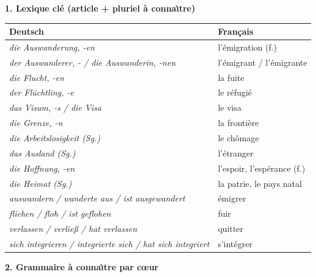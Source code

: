 \documentclass[11pt]{article}
\newcommand{\ière}{\textsuperscript{re}}\newcommand{\ième}{\textsuperscript{e}}
\newcommand{\all}[1]{\ifmmode\text{\textit{#1}}\else\begingroup\selectlanguage{ngerman}\itshape #1\endgroup\fi}
\begin{document}
\begin{aretenir}[L'essentiel de la le\c{c}on]
\textbf{1. Lexique cl\'e (article + pluriel \`a conna\^{\i}tre)}

\begin{center}
\begin{tabularx}{\linewidth}{|l|X|}
\hline
\rowcolor{popblueL} \textbf{Deutsch} & \textbf{Fran\c{c}ais} \\
\hline
\all{die Auswanderung, -en} & l'\'emigration (f.) \\
\hline
\all{der Auswanderer, - / die Auswanderin, -nen} & l'\'emigrant / l'\'emigrante \\
\hline
\all{die Flucht, -en} & la fuite \\
\hline
\all{der Fl\"uchtling, -e} & le r\'efugi\'e \\
\hline
\all{das Visum, -s / die Visa} & le visa \\
\hline
\all{die Grenze, -n} & la fronti\`ere \\
\hline
\all{die Arbeitslosigkeit (Sg.)} & le ch\^omage \\
\hline
\all{das Ausland (Sg.)} & l'\'etranger \\
\hline
\all{die Hoffnung, -en} & l'espoir, l'esp\'erance (f.) \\
\hline
\all{die Heimat (Sg.)} & la patrie, le pays natal \\
\hline
\all{auswandern / wanderte aus / ist ausgewandert} & \'emigrer \\
\hline
\all{fliehen / floh / ist geflohen} & fuir \\
\hline
\all{verlassen / verlie\ss{} / hat verlassen} & quitter \\
\hline
\all{sich integrieren / integrierte sich / hat sich integriert} & s'int\'egrer \\
\hline
\end{tabularx}
\end{center}

\textbf{2. Grammaire \`a conna\^{\i}tre par c\oe ur}


\end{aretenir}
\end{document}
